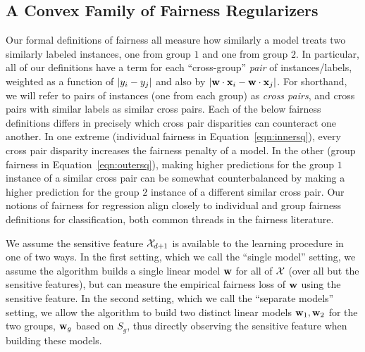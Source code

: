 \subsection{A Convex Family of Fairness Regularizers}
Our formal definitions of fairness all measure how similarly a model
treats two similarly labeled instances, one from group $1$ and one
from group $2$.
In particular, all of our definitions have a term for each
``cross-group'' \emph{pair} of instances/labels, weighted as a
function of $|y_{i}- y_{j}|$ and also by $|\mathbf{w}\cdot {\bf x}_{i} - \mathbf{w} \cdot {\bf x}_{j}|$.
For shorthand, we will refer to pairs of instances (one from each
group) as \emph{cross pairs}, and cross pairs with similar labels as
similar cross pairs.
Each of the below fairness definitions differs in precisely which
cross pair disparities can counteract one another. In one extreme
(individual fairness in Equation~\ref{eqn:innersq}), every cross pair
disparity increases the fairness penalty of a model. In the other
(group fairness in Equation~\ref{eqn:outersq}), making higher
predictions for the group $1$ instance of a similar cross pair can be
somewhat counterbalanced by making a higher prediction for the group
$2$ instance of a different similar cross pair. Our notions of
fairness for regression align closely to individual and group fairness
definitions for classification, both common threads in the fairness
literature.


\begin{remark}
  We assume the sensitive feature $\mathcal{X}_{d+1}$ is available to the
  learning procedure in one of two ways.  In the first setting, which
  we call the ``single model'' setting, we assume the algorithm builds a
  single linear model $\mathbf{w}$ for all of $\mathcal{X}$ (over all but the
  sensitive features), but can measure the empirical fairness loss of
  $\mathbf{w}$ using the sensitive feature. In the second setting, which we
  call the ``separate models'' setting, we allow the algorithm to build two
  distinct linear models $\mathbf{w}_1, \mathbf{w}_2$ for the two groups, $\mathbf{w}_g$
  based on $S_g$, thus directly observing the sensitive feature when
  building these models.
\end{remark}


